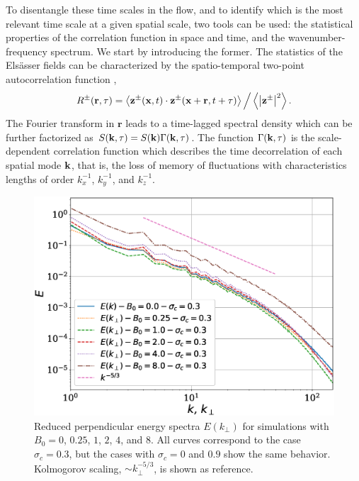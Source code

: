 \documentclass[aip,pop,reprint,amsmath,amssymb,floatfix]{revtex4-1}
\renewcommand{\vec}[1]{\mathbf{#1}}
\begin{document}
To disentangle these time scales in the flow, and to identify which is 
the most relevant time scale at a given spatial scale, two tools can be 
used: the statistical properties of the correlation function in space
and time, and the wavenumber-frequency spectrum. We start by
introducing the former. The statistics of the Els\"asser fields can be
characterized by the spatio-temporal two-point autocorrelation
function \cite{servidio_time_2011},
 \begin{equation}
 R^\pm({\bf r},\tau) = \left\langle {\bf z}^\pm( {\bf x},t) \cdot
   {\bf z} ^\pm( {\bf x} + {\bf r},t+\tau) \right\rangle \Big/ 
   \left\langle \left|{{\bf z}^\pm}\right|^2 \right\rangle.
 \label{eq:Rzij}
 \end{equation}
 The Fourier transform in $\vec{r}$ leads to a time-lagged spectral
 density which can be further factorized as
 $S({\bf k},\tau) = S({\bf k})\Gamma({\bf k},\tau)$. The function
 $\Gamma({\bf k},\tau)$ is the scale-dependent correlation function
 \cite{heisenberg_zur_1948,
   comte-bellot_simple_1971,orszag_numerical_1972} which describes the
 time decorrelation of each spatial mode ${\bf k}$, that is, the loss
 of memory of fluctuations with characteristics lengths of order
 $k_x^{-1}$, $k_y^{-1}$, and $k_z^{-1}$.

\begin{figure}
\centering
\includegraphics[width=1\columnwidth]{fig1_E.eps}
\caption{Reduced perpendicular energy spectra $E(k_\perp)$ for
  simulations with $B_0=0$, $0.25$, $1$, $2$, $4$, and $8$. All curves
  correspond to the case $\sigma_c = 0.3$, but the cases with $\sigma_c = 0$ and
  $0.9$ show the same behavior. Kolmogorov scaling,
  $\sim k_\perp^{-5/3}$, is shown as reference.}
\label{fig1:E}
\end{figure}
\end{document}
